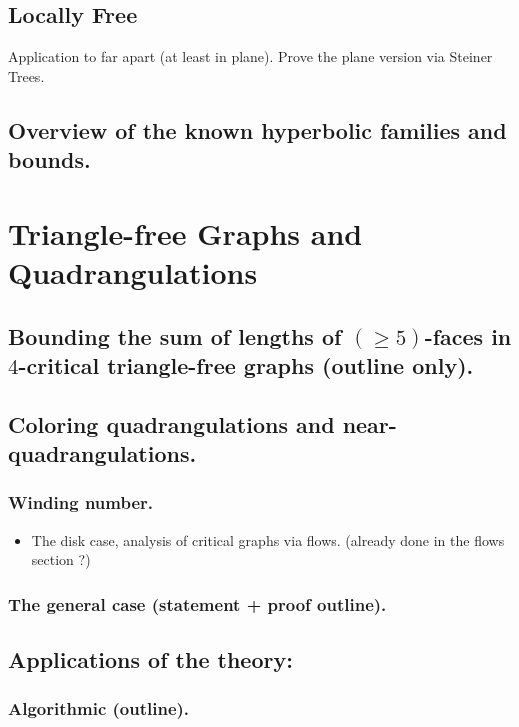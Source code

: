 \documentclass[12pt,twoside,openright,a4paper]{book}
\begin{document}
\section{Locally Free}

Application to far apart (at least in plane). Prove the plane version via Steiner Trees.

\section{Overview of the known hyperbolic families and bounds.}


\chapter{Triangle-free Graphs and Quadrangulations}\label{chap:trfree}


\section{Bounding the sum of lengths of $(\ge\!5)$-faces in $4$-critical triangle-free graphs (outline only).}
\section{Coloring quadrangulations and near-quadrangulations.}

\subsection{ Winding number.}
\begin{itemize}
\item The disk case, analysis of critical graphs via flows. (already done in the flows section ?)
\end{itemize}

\subsection{The general case (statement + proof outline).}

\section{Applications of the theory:}
\subsection{Algorithmic (outline).}
\end{document}
